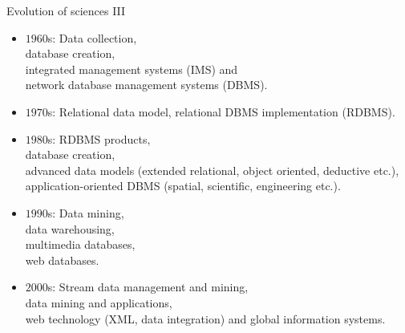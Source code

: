 \documentclass[aspectratio=169,t]{beamer}
\begin{document}
  { 
    \begin{frame}{Evolution of sciences III}
        \begin{itemize}
            \item $1960$s: Data collection, \\
                  \hspace{1cm} database creation, \\
                  \hspace{1cm} integrated management systems (IMS) and \\
                  \hspace{1cm} network database management systems (DBMS).
            \item $1970$s: Relational data model, relational DBMS implementation (RDBMS).
            \item $1980$s: RDBMS products,\\
                  \hspace{1cm} database creation, \\
                  \hspace{1cm} advanced data models (extended relational, object oriented, deductive etc.),\\
                  \hspace{1cm} application-oriented DBMS (spatial, scientific, engineering etc.).
            \item $1990$s: Data mining,\\
                  \hspace{1cm} data warehousing, \\
                  \hspace{1cm} multimedia databases,\\
                  \hspace{1cm} web databases.
            \item $2000$s: Stream data management and mining,\\
                  \hspace{1cm} data mining and applications, \\
                  \hspace{1cm} web technology (XML, data integration) and global information systems.
        \end{itemize}
    \end{frame}
  }
\end{document}
